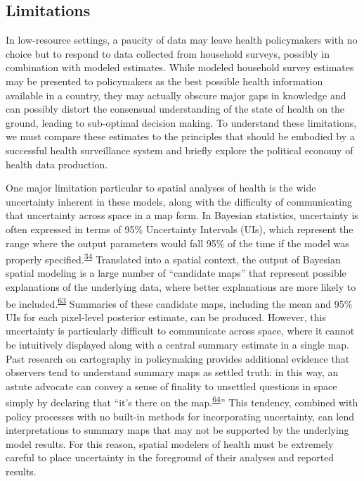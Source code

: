 \documentclass[
]{article}
\begin{document}
\hypertarget{limitations}{%
\subsection{Limitations}\label{limitations}}

In low-resource settings, a paucity of data may leave health policymakers with no choice but to respond to data collected from household surveys, possibly in combination with modeled estimates. While modeled household survey estimates may be presented to policymakers as the best possible health information available in a country, they may actually obscure major gaps in knowledge and can possibly distort the consensual understanding of the state of health on the ground, leading to sub-optimal decision making. To understand these limitations, we must compare these estimates to the principles that should be embodied by a successful health surveillance system and briefly explore the political economy of health data production.

One major limitation particular to spatial analyses of health is the wide uncertainty inherent in these models, along with the difficulty of communicating that uncertainty across space in a map form. In Bayesian statistics, uncertainty is often expressed in terms of 95\% Uncertainty Intervals (UIs), which represent the range where the output parameters would fall 95\% of the time if the model was properly specified.\textsuperscript{\protect\hyperlink{ref-McElreath2016}{34}} Translated into a spatial context, the output of Bayesian spatial modeling is a large number of ``candidate maps'' that represent possible explanations of the underlying data, where better explanations are more likely to be included.\textsuperscript{\protect\hyperlink{ref-Patil2011}{63}} Summaries of these candidate maps, including the mean and 95\% UIs for each pixel-level posterior estimate, can be produced. However, this uncertainty is particularly difficult to communicate across space, where it cannot be intuitively displayed along with a central summary estimate in a single map. Past research on cartography in policymaking provides additional evidence that observers tend to understand summary maps as settled truth: in this way, an astute advocate can convey a sense of finality to unsettled questions in space simply by declaring that ``it's there on the map.\textsuperscript{\protect\hyperlink{ref-Elwood2006}{64}}'' This tendency, combined with policy processes with no built-in methods for incorporating uncertainty, can lend interpretations to summary maps that may not be supported by the underlying model results. For this reason, spatial modelers of health must be extremely careful to place uncertainty in the foreground of their analyses and reported results.
\end{document}
